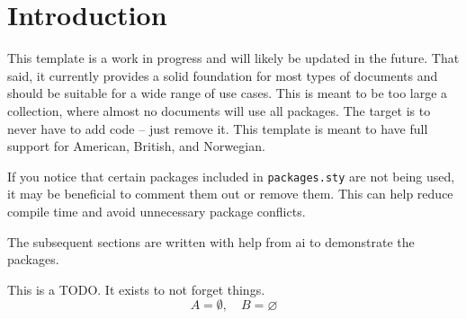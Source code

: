 \section{Introduction}

This template is a work in progress and will likely be updated in the future. That said, it currently provides a solid foundation for most types of documents and should be suitable for a wide range of use cases. This is meant to be too large a collection, where almost no documents will use all packages. The target is to never have to add code \--- just remove it. This template is meant to have full support for American, British, and Norwegian.

If you notice that certain packages included in \texttt{packages.sty} are not being used, it may be beneficial to comment them out or remove them. This can help reduce compile time and avoid unnecessary package conflicts.

The subsequent sections are written with help from \gls{ai} to demonstrate the packages.

This is a TODO. It exists to not forget things.
\begin{equation*}
    A = \emptyset, \quad B = \varnothing
\end{equation*}
